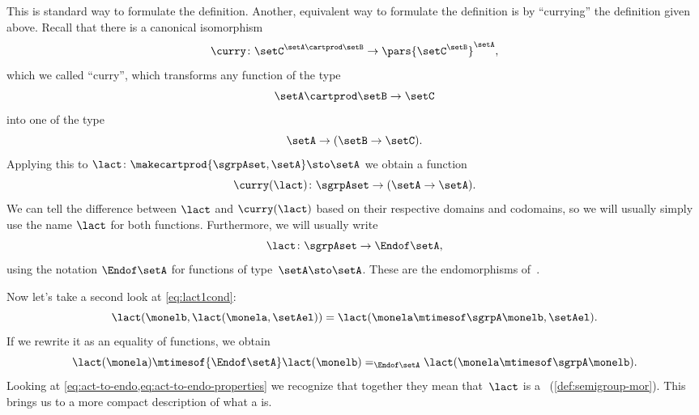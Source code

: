 
This is standard way to formulate the definition. Another, equivalent way to formulate the definition is by ``currying'' the definition given above. Recall that there is a canonical isomorphism
\begin{equation}
\curry \colon \setC^{\setA \cartprod \setB} \to \pars{\setC^\setB}^\setA,
\end{equation}
which we called ``curry'', which transforms any function of the type
\begin{equation}
\setA \cartprod \setB \to \setC
\end{equation}
into one of the type
\begin{equation}
\setA \to (\setB \to \setC).
\end{equation}
Applying this to $\lact \colon \makecartprod{\sgrpAset, \setA} \sto \setA$ we obtain a function 
\begin{equation}
\curry(\lact) \colon \sgrpAset \to (\setA \to \setA). 
\end{equation}
We can tell the difference between $\lact$ and $\curry(\lact)$ based on their respective domains and codomains, so we will usually simply use the name $\lact$ for both functions. Furthermore, we will usually write
\begin{equation}
    \label{eq:act-to-endo}
    \lact \colon \sgrpAset \to \Endof\setA,
\end{equation}
using the notation $\Endof\setA$ for functions of type~$\setA \sto \setA$. These are the endomorphisms of~\setA.

Now let's take a second look at \cref{eq:lact1cond}:
%
\begin{equation}
    \label{eq:lact1cond-2}
    \lact(\monelb, \lact(\monela, \setAel)) = \lact(\monela \mtimesof\sgrpA \monelb, \setAel).
\end{equation}
%
If we rewrite it as an equality of functions, we obtain
%
\begin{equation}
    \label{eq:act-to-endo-properties}
    \lact(\monela) \mtimesof{\Endof\setA} \lact(\monelb) =_{\Endof\setA} \lact(\monela \mtimesof\sgrpA \monelb).
\end{equation}
%
Looking at \cref{eq:act-to-endo,eq:act-to-endo-properties} we recognize that together they mean that~$\lact$ is a ~(\cref{def:semigroup-mor}).
This brings us to a more compact description of what a  is.


